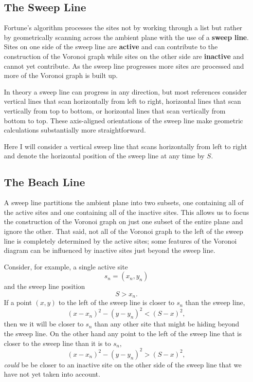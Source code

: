 \documentclass[
  letterpaper,
  DIV=11,
  numbers=noendperiod]{scrartcl}
\begin{document}
\subsection{The Sweep Line}\label{the-sweep-line}

Fortune's algorithm processes the sites not by working through a list
but rather by geometrically scanning across the ambient plane with the
use of a \textbf{sweep line}. Sites on one side of the sweep line are
\textbf{active} and can contribute to the construction of the Voronoi
graph while sites on the other side are \textbf{inactive} and cannot yet
contribute. As the sweep line progresses more sites are processed and
more of the Voronoi graph is built up.

In theory a sweep line can progress in any direction, but most
references consider vertical lines that scan horizontally from left to
right, horizontal lines that scan vertically from top to bottom, or
horizontal lines that scan vertically from bottom to top. These
axis-aligned orientations of the sweep line make geometric calculations
substantially more straightforward.

Here I will consider a vertical sweep line that scans horizontally from
left to right and denote the horizontal position of the sweep line at
any time by \(S\).

\subsection{The Beach Line}\label{the-beach-line}

A sweep line partitions the ambient plane into two subsets, one
containing all of the active sites and one containing all of the
inactive sites. This allows us to focus the construction of the Voronoi
graph on just one subset of the entire plane and ignore the other. That
said, not all of the Voronoi graph to the left of the sweep line is
completely determined by the active sites; some features of the Voronoi
diagram can be influenced by inactive sites just beyond the sweep line.

Consider, for example, a single active site \[
s_{n} = (x_{n}, y_{n})
\] and the sweep line position \[
S > x_{n}.
\] If a point \((x, y)\) to the left of the sweep line is closer to
\(s_{n}\) than the sweep line, \[
(x - x_{n})^{2} - (y - y_{n})^{2} < (S - x)^{2},
\] then we it will be closer to \(s_{n}\) than any other site that might
be hiding beyond the sweep line. On the other hand any point to the left
of the sweep line that is closer to the sweep line than it is to
\(s_{n}\), \[
(x - x_{n})^{2} - (y - y_{n})^{2} > (S - x)^{2},
\] \emph{could} be be closer to an inactive site on the other side of
the sweep line that we have not yet taken into account.
\end{document}
